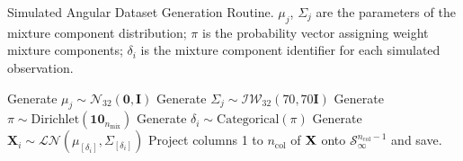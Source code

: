 \begin{algorithm}  %
        \caption{Simulated Angular Dataset Generation Routine\label{algo:simulated}.
        $\mu_j$, $\Sigma_j$ are the parameters of the mixture component distribution; 
        $\pi$ is the probability vector assigning weight mixture components; $\delta_i$ 
        is the mixture component identifier for each simulated observation.}
        \begin{algorithmic}
                \State Generate $\mu_{j} \sim \mathcal{N}_{32}\left(\bm{0},\bm{I}\right)$
                \State Generate $\Sigma_{j}\sim\mathcal{IW}_{32}\left(70,70 \bm{I}\right)$
            \EndFor
            \State Generate $\pi\sim\text{Dirichlet}(\bm{10}_{n_{\text{mix}}})$
                \State Generate $\delta_i \sim \text{Categorical}(\pi)$
                \State Generate $\bm{X}_i \sim \mathcal{LN}\left(\mu_{[\delta_i]},\Sigma_{[\delta_i]}\right)$
            \EndFor
                \State Project columns 1 to $n_{\text{col}}$ of ${\bf X}$ onto $\mathcal{S}_{\infty}^{n_{\text{col}} - 1}$ and save.
            \EndFor
        \EndFor
        \EndFor
        \end{algorithmic}
    \end{algorithm}


